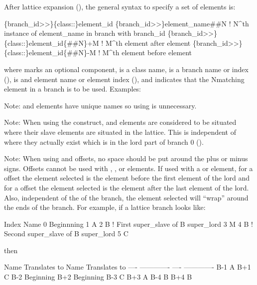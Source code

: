 {{{{{\vspace*{1pt}
After lattice expansion (), the general syntax to specify a set of elements is:
\begin{example}
  \{branch_id>>\}\{class::\}element_id
  \{branch_id>>\}element_name##N        ! N^th instance of element_name in branch with branch_id
  \{branch_id>>\}\{class::\}element_id\{##N\}+M  ! M^th element after element
  \{branch_id>>\}\{class::\}element_id\{##N\}-M  ! M^th element before element
\end{example}
where  marks an optional component,  is a class name,  is a
branch name or index (),  is and element name or element index
(), and  indicates that the N\Th matching element in a branch is to be
used. Examples:
Note:  and  elements have unique names so using \vn{\#\#} is unnecessary.

Note: When using the \vn{\#\#} construct,  and  elements are considered 
to be situated where their slave elements are situated in the lattice. This is independent of where
they actually exist which is in the lord part of branch 0 ().

Note: When using  and  offsets, no space should be put around the plus or minus signs.
Offsets cannot be used with , ,  or 
elements. If used with a  or  element, for a  offset the element
selected is the \Th element before the first  element of the lord and for a 
offset the element selected is the \Th element after the last  element of the
lord. Also, independent of the  of the branch, the element selected will ``wrap''
around the ends of the branch.  For example, if a lattice branch looks like:
\pagebreak[2]
\begin{example}
  Index  Name
    0    Beginnning
    1    A
    2    B       ! First super_slave of B super_lord
    3    M
    4    B       ! Second super_slave of B super_lord
    5    C
\end{example}
then
\begin{example}
    Name  Translates to     Name  Translates to
    ----  -------------     ----  -------------
    B-1   A                 B+1   C
    B-2   Beginning         B+2   Beginning
    B-3   C                 B+3   A
    B-4   B               B+4   B
\end{example}

}}}}}
